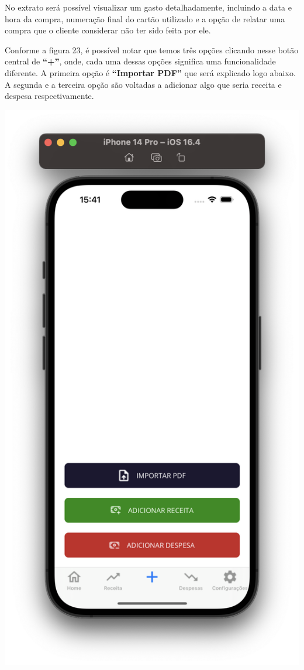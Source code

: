 No extrato será possível visualizar um gasto detalhadamente, incluindo a data e hora da compra, numeração final do cartão utilizado e a opção de relatar uma compra que o cliente considerar não ter sido feita por ele. 

Conforme a figura 23, é possível notar que temos três opções clicando nesse botão central de \textbf{“+”}, onde, cada uma dessas opções significa uma funcionalidade diferente. A primeira opção é \textbf{“Importar PDF”} que será explicado logo abaixo. A segunda e a terceira opção são voltadas a adicionar algo que seria receita e despesa respectivamente. 

    \vspace{\baselineskip}
    \begin{center}
        \begin{minipage}{\textwidth}
            \centering
            \includegraphics[scale=0.2]{figs/figura23.png}

\end{minipage}
\end{center}
